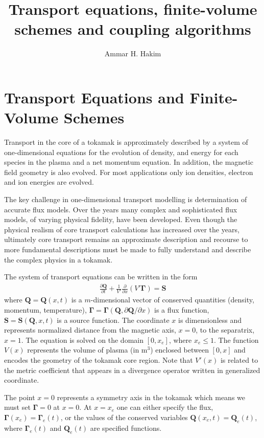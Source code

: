 \documentclass[11pt, reqno]{amsart}
\title{Transport equations, finite-volume schemes and coupling
  algorithms}%
\author{Ammar H. Hakim}%
\date{}
\newcommand{\pfrac}[2]{\frac{\partial #1}{\partial #2}}
\newcommand{\pfraca}[1]{\frac{\partial}{\partial #1}}
\newcommand{\pfracb}[2]{\partial #1/\partial #2}
\newcommand{\mvec}[1]{\mathbf{#1}}
\newcommand{\gvec}[1]{\boldsymbol{#1}}
\theoremstyle{definition}
\begin{document}
\maketitle

\section{Transport Equations and Finite-Volume Schemes}

Transport in the core of a tokamak is approximately described by a
system of one-dimensional equations for the evolution of density, and
energy for each species in the plasma and a net momentum equation. In
addition, the magnetic field geometry is also evolved. For most
applications only ion densities, electron and ion energies are
evolved.

The key challenge in one-dimensional transport modelling is
determination of accurate flux models. Over the years many complex and
sophisticated flux models, of varying physical fidelity, have been
developed. Even though the physical realism of core transport
calculations has increased over the years, ultimately core transport
remains an approximate description and recourse to more fundamental
descriptions must be made to fully understand and describe the complex
physics in a tokamak.

The system of transport equations can be written in the form
\begin{align}
  \pfrac{\mvec{Q}}{t} 
  + \frac{1}{V'} \pfraca{x} \left( V' \gvec{\Gamma} \right) = \mvec{S}
  \label{eq:transport}
\end{align}
where $\mvec{Q} = \mvec{Q}(x,t)$ is a $m$-dimensional vector of
conserved quantities (density, momentum, temperature), $\gvec{\Gamma}
= \gvec{\Gamma}(\mvec{Q},\pfracb{\mvec{Q}}{x})$ is a flux function,
$\mvec{S} = \mvec{S}(\mvec{Q},x,t)$ is a source function. The
coordinate $x$ is dimensionless and represents normalized distance
from the magnetic axis, $x=0$, to the separatrix, $x=1$. The equation
is solved on the domain $[0,x_e]$, where $x_e \le 1$. The function
$V(x)$ represents the volume of plasma (in m$^3$) enclosed between
$[0,x]$ and encodes the geometry of the tokamak core region. Note that
$V'(x)$ is related to the metric coefficient that appears in a
divergence operator written in generalized coordinate. 

The point $x=0$ represents a symmetry axis in the tokamak which means
we must set $\gvec{\Gamma}=0$ at $x=0$. At $x=x_e$ one can either
specify the flux, $\gvec{\Gamma}(x_e)=\gvec{\Gamma}_e(t)$, or the
values of the conserved variables $\mvec{Q}(x_e,t)=\mvec{Q}_e(t)$,
where $\gvec{\Gamma}_e(t)$ and $\mvec{Q}_e(t)$ are specified
functions.
\end{document}
